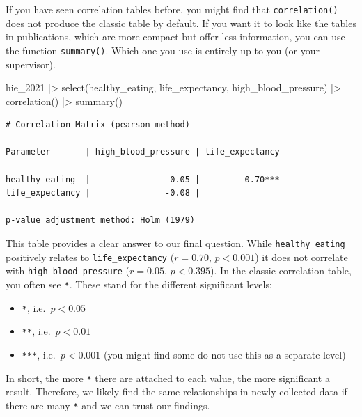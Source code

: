 \documentclass[
  letterpaper,
  DIV=11,
  numbers=noendperiod]{scrreprt}
\newenvironment{Shaded}{\begin{snugshade}}{\end{snugshade}}
\newcommand{\FunctionTok}[1]{\textcolor[rgb]{0.28,0.35,0.67}{#1}}
\newcommand{\NormalTok}[1]{\textcolor[rgb]{0.00,0.23,0.31}{#1}}
\newcommand{\SpecialCharTok}[1]{\textcolor[rgb]{0.37,0.37,0.37}{#1}}
\begin{document}
If you have seen correlation tables before, you might find that
\texttt{correlation()} does not produce the classic table by default. If
you want it to look like the tables in publications, which are more
compact but offer less information, you can use the function
\texttt{summary()}. Which one you use is entirely up to you (or your
supervisor).

\begin{Shaded}
\begin{Highlighting}[]
\NormalTok{hie\_2021 }\SpecialCharTok{|\textgreater{}}
  \FunctionTok{select}\NormalTok{(healthy\_eating, life\_expectancy, high\_blood\_pressure) }\SpecialCharTok{|\textgreater{}}
  \FunctionTok{correlation}\NormalTok{() }\SpecialCharTok{|\textgreater{}}
  \FunctionTok{summary}\NormalTok{()}
\end{Highlighting}
\end{Shaded}

\begin{verbatim}
# Correlation Matrix (pearson-method)

Parameter       | high_blood_pressure | life_expectancy
-------------------------------------------------------
healthy_eating  |               -0.05 |         0.70***
life_expectancy |               -0.08 |                

p-value adjustment method: Holm (1979)
\end{verbatim}

This table provides a clear answer to our final question. While
\texttt{healthy\_eating} positively relates to \texttt{life\_expectancy}
(\(r = 0.70\), \(p <0.001\)) it does not correlate with
\texttt{high\_blood\_pressure} (\(r = 0.05\), \(p <0.395\)). In the
classic correlation table, you often see \texttt{*}. These stand for the
different significant levels:

\begin{itemize}
\item
  \texttt{*}, i.e.~\(p < 0.05\)
\item
  \texttt{**}, i.e.~\(p < 0.01\)
\item
  \texttt{***}, i.e.~\(p < 0.001\) (you might find some do not use this
  as a separate level)
\end{itemize}

In short, the more \texttt{*} there are attached to each value, the more
significant a result. Therefore, we likely find the same relationships
in newly collected data if there are many \texttt{*} and we can trust
our findings.
\end{document}
